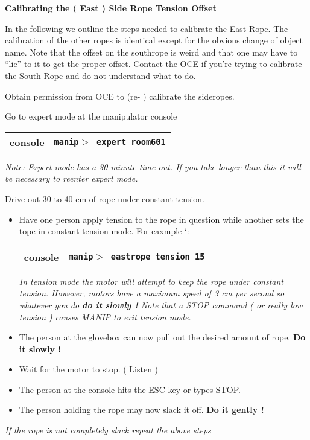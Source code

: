\vspace*{0.25in}
\noindent
{\bf Calibrating the ( East ) Side Rope Tension Offset}

 In the following we outline  the steps needed to calibrate the East Rope. The 
calibration of the other ropes is identical except for the obvious change of object name.
Note that the offset on the southrope is weird and that one may have to ``lie'' to
it to get the proper offset. Contact the OCE if you're trying to calibrate the South Rope
and do not understand what to do.


\begin{enumerate}


\checkitem Obtain permission from OCE to (re- ) calibrate the sideropes.

\checkitem Go to expert mode at the manipulator console

  \begin{center}
  \begin{tabular}{|l|l|}
  \hline
  console & {\tt manip$>$ expert room601} \\
  \hline
  \end{tabular}
  \end{center}
  {\small\em Note: Expert mode has a 30 minute time out.  If 
   you take longer than this it will be necessary to reenter expert mode.}

\checkitem  Drive out 30 to 40 cm of rope under constant tension.
\begin{itemize}
\item
     Have one person apply tension to the rope in question while another sets the
tope in constant tension mode. For eaxmple `:
  \begin{center}
  \begin{tabular}{|l|l|}
  \hline
  console & {\tt manip$>$ eastrope tension 15} \\
  \hline
  \end{tabular}
  \end{center}
\small
{\em  In tension mode the motor will attempt to keep the rope under constant tension. However,
motors have a maximum speed of 3 cm per second so whatever you do {\bf do it slowly  !}
 Note that a STOP command ( or really low tension ) causes MANIP to exit tension mode. }
\normalsize
\item The person at the glovebox can now pull out the desired amount of rope. {\bf Do it
slowly !}
\item Wait for the motor to stop. ( Listen )
\item The person at the console hits the ESC key or types STOP.
\item The person holding the rope may now slack it off. {\bf Do it gently !}
\end{itemize}
\small
{\em If the rope is not completely slack repeat the above steps }
\normalsize



\end{enumerate}
